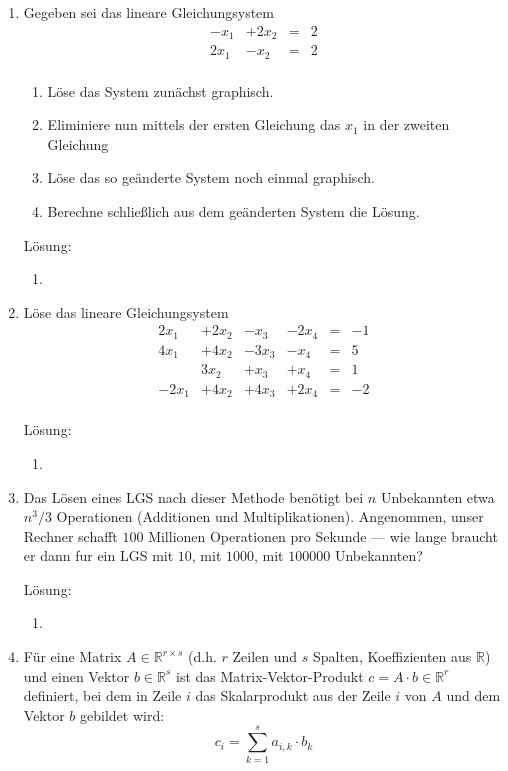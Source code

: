 \documentclass[../main.tex]{subfiles}
\begin{document}
\begin{enumerate}
	\item Gegeben sei das lineare Gleichungsystem
	      \[ \begin{array}{cccc}
			      -x_1 & +2 x_2 & = & 2 \\
			      2x_1 & -x_2   & = & 2 \\
		      \end{array} \]
	      \begin{enumerate}
		      \item Löse das System zunächst graphisch.
		      \item Eliminiere nun mittels der ersten Gleichung das \( x_1 \)
		            in der zweiten Gleichung
		      \item Löse das so geänderte System noch einmal graphisch.
		      \item Berechne schließlich aus dem geänderten System die Lösung.
	      \end{enumerate}

	      Lösung:
	      \begin{enumerate}
		      \item
	      \end{enumerate}
	\item Löse das lineare Gleichungsystem
	      \[ \begin{array}{cccccc}
			      2x_1  & +2x_2 & -x_3  & -2x_4 & = & -1 \\
			      4x_1  & +4x_2 & -3x_3 & -x_4  & = & 5  \\
			            & 3x_2  & +x_3  & +x_4  & = & 1  \\
			      -2x_1 & +4x_2 & +4x_3 & +2x_4 & = & -2 \\
		      \end{array} \]

	      Lösung:
	      \begin{enumerate}
		      \item
	      \end{enumerate}
	\item Das Lösen eines LGS nach dieser Methode benötigt bei \( n \) Unbekannten etwa
	      \( n^3/3 \) Operationen (Additionen und Multiplikationen). Angenommen, unser
	      Rechner schafft \( 100 \) Millionen Operationen pro Sekunde — wie lange braucht
	      er dann fur ein LGS mit \( 10 \), mit \( 1000 \), mit \( 100000 \) Unbekannten?

	      Lösung:
	      \begin{enumerate}
		      \item
	      \end{enumerate}
	\item Für eine Matrix \( A \in \mathbb{R}^{ r \times s } \) (d.h. \( r \) Zeilen und \( s \)
	      Spalten, Koeffizienten aus
	      \( \mathbb{R} \)) und einen Vektor \( b \in \mathbb{R}^s \) ist das Matrix-Vektor-Produkt
	      \( c = A \cdot b \in \mathbb{R}^r \) definiert, bei dem in Zeile \( i \) das Skalarprodukt
	      aus der Zeile \( i \) von \( A \) und dem Vektor \( b \) gebildet wird:
	      \[ c_i = \sum_{ k = 1 }^{s} a_{i,k} \cdot b_k \]


\end{enumerate}
\end{document}

